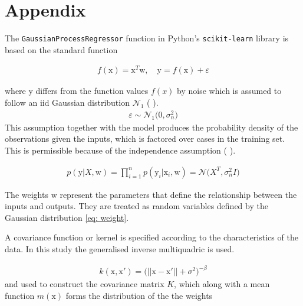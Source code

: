 \documentclass[11pt,a4paper]{article}
\newcommand{\citeboth}[1]{\citeauthor{#1} \citep{#1}}
\begin{document}
\newpage

\section{Appendix}
\label{sec: appendix}

The \texttt{GaussianProcessRegressor} function in Python's \texttt{scikit-learn} library is based on the 
standard function

\begin{align} 
    f(\boldsymbol{\mathrm{x}}) = \boldsymbol{\mathrm{x}}^{T}\boldsymbol{\mathrm{w}}, \quad{\boldsymbol{\mathrm{y}} = f(\boldsymbol{\mathrm{x}}) + \varepsilon}
\end{align}

where $\boldsymbol{\mathrm{y}}$ differs from the function values $f(x)$ by noise which is assumed
to follow an iid Gaussian distribution 
$\mathcal{N}_1$ (\citeboth{rasmussen2006}).
\begin{align*}
    \varepsilon \sim \mathcal{N}_1 \bigl(0, \sigma_{n}^2\bigr)
\end{align*}
This assumption together with the model produces the 
probability density of the observations given the inputs, 
which is factored over cases in the training set. This is
permissible because of the independence assumption (\citeboth{rasmussen2006}).

\begin{align}
    p(\boldsymbol{\mathrm{y}}|X,\boldsymbol{\mathrm{w}}) = \prod_{i=1}^{n} p(\boldsymbol{\mathrm{y}}_i|\boldsymbol{\mathrm{x}}_i ,\boldsymbol{\mathrm{w}}) = \mathcal{N}\bigl(X^T, \sigma_{n}^2 I\bigr)
\end{align}

The weights \( \boldsymbol{\mathrm{w}} \) represent the parameters that define the relationship between the inputs and outputs. 
They are treated as random variables defined by the Gaussian distribution \eqref{eq: weight}.


A covariance function or kernel
is specified according to the characteristics of the data. In this study the
generalised inverse multiquadric is used.

\begin{align}
    k(\boldsymbol{\mathrm{x}},\boldsymbol{\mathrm{x}}') = \biggl( ||\boldsymbol{\mathrm{x}}-\boldsymbol{\mathrm{x}}'|| + \sigma^2\biggr)^{-\beta} \label{eq: gimq}
\end{align}
and used to construct the covariance matrix $K$, which along with 
a mean function $m(\boldsymbol{\mathrm{x}})$ forms the distribution of the the weights 
\end{document}
